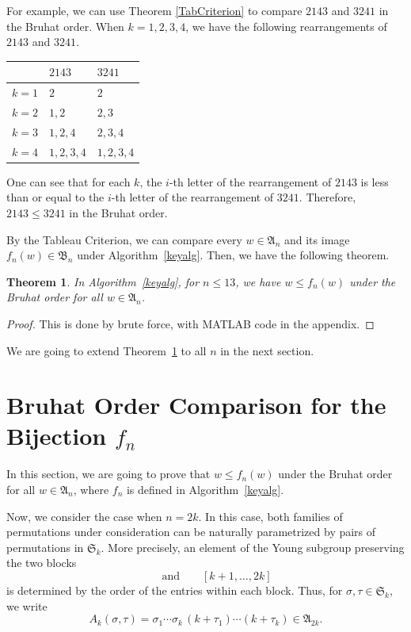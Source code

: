 \documentclass[12pt]{amsart}
\newtheorem{thm}{Theorem}[section]
\theoremstyle{definition}
\numberwithin{equation}{section}
\begin{document}
For example, we can use Theorem \ref{TabCriterion} to compare $2143 $ and $3241$ in the Bruhat order. When $k=1,2,3,4$, we have the following rearrangements of $2143$ and $3241$.
\begin{center}
\begin{tabularx}{0.8\textwidth} {
  | >{\centering\arraybackslash}X
  | >{\centering\arraybackslash}X
  | >{\centering\arraybackslash}X | }
 \hline
  & $2143$ & $3241$ \\
 \hline
 $k=1$  & $2$  & $2$  \\
\hline
$k=2$  & $1,2$  & $2,3$  \\
\hline
$k=3$  & $1,2,4$  & $2,3,4$  \\
\hline
$k=4$  & $1,2,3,4$  & $1,2,3,4$  \\
\hline

\end{tabularx}
\end{center}
One can see that for each $k$, the $i$-th letter of the rearrangement of $2143$ is less than or equal to the $i$-th letter of the rearrangement of $3241$. Therefore, $2143 \leq 3241$ in the Bruhat order.

By the Tableau Criterion, we can compare every $w\in \mathfrak A_n$ and its image $f_n(w) \in\mathfrak B_n$ under Algorithm~\ref{keyalg}. Then, we have the following theorem.

\begin{thm}\label{t:special n}
    In Algorithm~\ref{keyalg}, for $n\leq 13$, we have $w\leq f_n(w)$ under the Bruhat order for all $w\in \mathfrak A_n$.
\end{thm}

\begin{proof}
    This is done by brute force, with MATLAB code in the appendix.
\end{proof}

We are going to extend Theorem~\ref{t:special n} to all $n$ in the next section.

\section{Bruhat Order Comparison for the Bijection $f_n$}\label{s:proof of balance case}

In this section, we are going to prove that $w \leq f_n (w)$ under the Bruhat order for all $w \in \mathfrak A_n$, where $f_n$ is defined in Algorithm~\ref{keyalg}.

Now, we consider the case when $n=2k$. In this case, both families of
permutations under consideration can be naturally parametrized by pairs
of permutations in $\mathfrak S_k$. More precisely, an element of the Young
subgroup preserving the two blocks
\begin{equation*}
[1,k]
\qquad\text{and}\qquad
[k+1,\ldots,2k]
\end{equation*}
is determined by the order of the entries within each block. Thus, for
$\sigma,\tau\in \mathfrak S_k$, we write
\begin{equation}
A_k(\sigma,\tau) = \sigma_1\cdots \sigma_k\,(k+\tau_1)\cdots(k+\tau_k) \in \mathfrak A_{2k}.
\end{equation}
\end{document}

